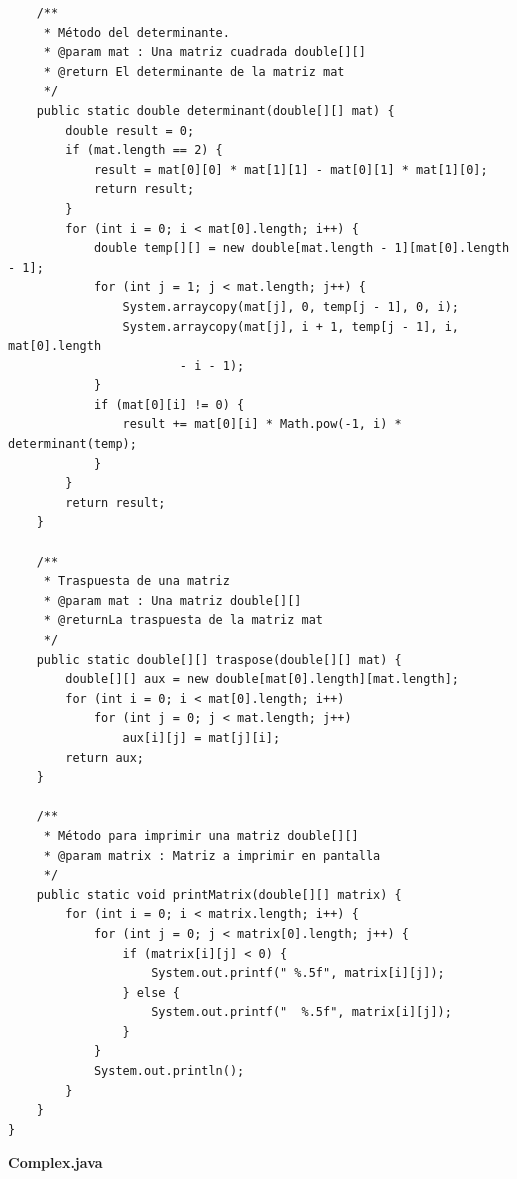 \documentclass[a4paper,10pt,spanish]{article}
\begin{document}
\begin{verbatim}
	/**
	 * Método del determinante.
	 * @param mat : Una matriz cuadrada double[][]
	 * @return El determinante de la matriz mat
	 */
	public static double determinant(double[][] mat) {
		double result = 0;
		if (mat.length == 2) {
			result = mat[0][0] * mat[1][1] - mat[0][1] * mat[1][0];
			return result;
		}
		for (int i = 0; i < mat[0].length; i++) {
			double temp[][] = new double[mat.length - 1][mat[0].length - 1];
			for (int j = 1; j < mat.length; j++) {
				System.arraycopy(mat[j], 0, temp[j - 1], 0, i);
				System.arraycopy(mat[j], i + 1, temp[j - 1], i, mat[0].length
						- i - 1);
			}
			if (mat[0][i] != 0) {
				result += mat[0][i] * Math.pow(-1, i) * determinant(temp);
			}
		}
		return result;
	}

	/**
	 * Traspuesta de una matriz
	 * @param mat : Una matriz double[][]
	 * @returnLa traspuesta de la matriz mat
	 */
	public static double[][] traspose(double[][] mat) {
		double[][] aux = new double[mat[0].length][mat.length];
		for (int i = 0; i < mat[0].length; i++)
			for (int j = 0; j < mat.length; j++)
				aux[i][j] = mat[j][i];
		return aux;
	}

	/**
	 * Método para imprimir una matriz double[][]
	 * @param matrix : Matriz a imprimir en pantalla
	 */
	public static void printMatrix(double[][] matrix) {
		for (int i = 0; i < matrix.length; i++) {
			for (int j = 0; j < matrix[0].length; j++) {
				if (matrix[i][j] < 0) {
					System.out.printf(" %.5f", matrix[i][j]);
				} else {
					System.out.printf("  %.5f", matrix[i][j]);
				}
			}
			System.out.println();
		}
	}
}

\end{verbatim}

\begin{center}
\textbf{Complex.java}
\end{center}
\end{document}
